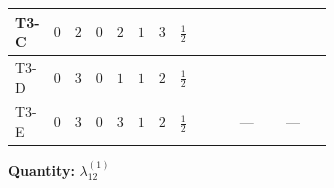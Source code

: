 \documentclass[8pt]{article}
\begin{document}
\begin{landscape}
\begin{longtable}{@{}llcccccc >{\raggedright\arraybackslash}p{0.21\linewidth} >{\raggedright\arraybackslash}p{0.21\linewidth} >{\raggedright\arraybackslash}p{0.21\linewidth}@{}}
\midrule
T3-C & $0$ & $2$ & $0$ & $2$ & $1$ & $3$ & $\frac{1}{2}$ & \scriptsize\adjustbox{max width=\linewidth}{$\begin{gathered} +4 {\lambda_{12}^{(1)}}^2\end{gathered}$} & \scriptsize\adjustbox{max width=\linewidth}{$\begin{gathered} +6 {\lambda_{12}^{(1)}} {\lambda_{S_1}^{(1)}}\end{gathered}$} & \scriptsize\adjustbox{max width=\linewidth}{$\begin{gathered} +6 {\lambda_{12}^{(1)}} {\lambda_{S_2}^{(1)}}\end{gathered}$} \\
\midrule
T3-D & $0$ & $3$ & $0$ & $1$ & $1$ & $2$ & $\frac{1}{2}$ & \scriptsize\adjustbox{max width=\linewidth}{$\begin{gathered} +4 {\lambda_{12}^{(1)}}^2\end{gathered}$} & \scriptsize\adjustbox{max width=\linewidth}{$\begin{gathered} +8 {\lambda_{12}^{(1)}} {\lambda_{S_1}^{(1)}}\end{gathered}$} & \scriptsize\adjustbox{max width=\linewidth}{$\begin{gathered} +4 {\lambda_{12}^{(1)}} {\lambda_{S_2}^{(1)}}\end{gathered}$} \\
\midrule
T3-E & $0$ & $3$ & $0$ & $3$ & $1$ & $2$ & $\frac{1}{2}$ & \scriptsize\adjustbox{max width=\linewidth}{$\begin{gathered} +4 {\lambda_{12}^{(1)}}^2\end{gathered}$} & --- & --- \\
\midrule
\bottomrule
\end{longtable}
\clearpage
\noindent\textbf{Quantity: }$\lambda_{12}^{(1)}$\par\smallskip

\end{landscape}
\end{document}
